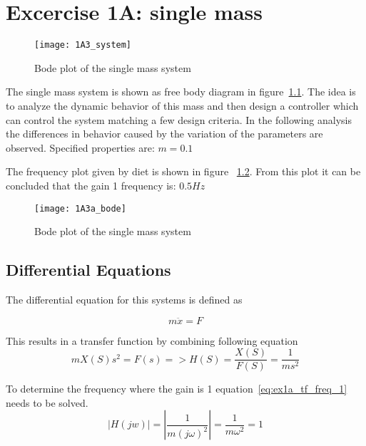 \documentclass[report.tex]{subfiles}
\begin{document}
\chapter{Excercise 1A: single mass}

\begin{figure}[H]
  \centering
\texttt{[image: 1A3\_system]}
\caption{Bode plot of the single mass system}
\label{fig:1A3_system}
\end{figure}

The single mass system is shown as free body diagram in figure~\ref{fig:1A3_system}. The idea is to analyze the dynamic behavior of this mass and then design a controller which can control the system matching a few design criteria. In the following analysis the differences in behavior caused by the variation of the parameters are observed. Specified properties are: 
$ m = 0.1 $

The frequency plot given by diet is shown in figure ~\ref{fig:1A3a_bode}.
From this plot it can be concluded that the gain 1 frequency is: $0.5Hz$

\begin{figure}[H]
  \centering
\texttt{[image: 1A3a\_bode]}
\caption{Bode plot of the single mass system}
\label{fig:1A3a_bode}
\end{figure}

\section{Differential Equations}

The differential equation for this systems is defined as

\begin{equation}
\label{eq:ex1a_diff}
m\ddot{x} = F
\end{equation}

This results in a transfer function by combining following equation
\begin{equation}
\label{eq:ex1a_tf_mass_2}
mX(S)s^2 = F(s) => H(S) = \frac{X(S)}{F(S)} = \frac{1}{ms^2}
\end{equation}

To determine the frequency where the gain is 1 equation~\ref{eq:ex1a_tf_freq_1} needs to be solved. 
\begin{equation}
\label{eq:ex1a_tf_freq_1}
|H(jw)| = |\frac{1}{m(j\omega)^2}| = \frac{1}{m\omega^2} = 1
\end{equation}
\end{document}
